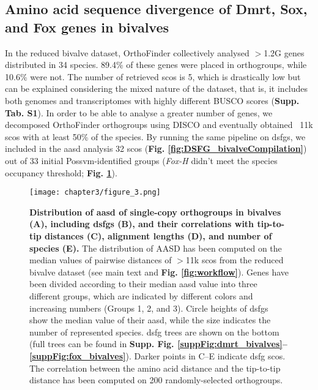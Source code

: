 \documentclass[../main.tex]{subfiles}
\begin{document}
\subsection{Amino acid sequence divergence of Dmrt, Sox, and Fox genes in bivalves}
In the reduced bivalve dataset, OrthoFinder collectively analysed $>$1.2G genes distributed in 34 species. 89.4\% of these genes were placed in orthogroups, while 10.6\% were not. The number of retrieved \glspl{sco} is 5, which is drastically low but can be explained considering the mixed nature of the dataset, that is, it includes both genomes and transcriptomes with highly different BUSCO scores (\textbf{Supp. Tab. S1}). In order to be able to analyse a greater number of genes, we decomposed OrthoFinder orthogroups using DISCO and eventually obtained ~11k \glspl{sco} with at least 50\% of the species. By running the same pipeline on \glspl{dsfg}, we included in the \gls{aasd} analysis 32 \glspl{sco} (\textbf{Fig. \ref{fig:DSFG_bivalveCompilation}}) out of 33 initial Possvm-identified groups (\textit{Fox-H} didn’t meet the species occupancy threshold; \textbf{Fig. \ref{fig:DSFG_bivalveDivergence}}).

\begin{figure}
	\centering
	\texttt{[image: chapter3/figure\_3.png]}
	\captionsetup{width=\textwidth}
	\caption{
		\textbf{Distribution of \gls{aasd} of single-copy orthogroups in bivalves (A), including \glspl{dsfg} (B), and their correlations with tip-to-tip distances (C), alignment lengths (D), and number of species (E).} The distribution of AASD has been computed on the median values of pairwise distances of $>$11k \glspl{sco} from the reduced bivalve dataset (see main text and \textbf{Fig. \ref{fig:workflow}}). Genes have been divided according to their median \gls{aasd} value into three different groups, which are indicated by different colors and increasing numbers (Groups 1, 2, and 3). Circle heights of \glspl{dsfg} show the median value of their \gls{aasd}, while the size indicates the number of represented species. \gls{dsfg} trees are shown on the bottom (full trees can be found in \textbf{Supp. Fig. \ref{suppFig:dmrt_bivalves}--\ref{suppFig:fox_bivalves}}). Darker points in C--E indicate \gls{dsfg} \glspl{sco}. The correlation between the amino acid distance and the tip-to-tip distance has been computed on 200 randomly-selected orthogroups.
	}
	\label{fig:DSFG_bivalveDivergence}
\end{figure}
\end{document}
